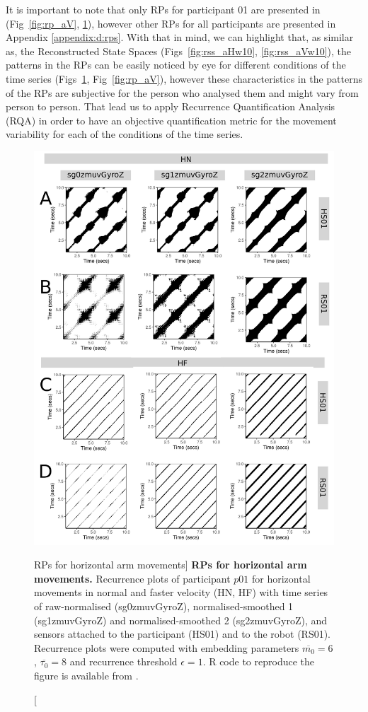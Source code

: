 It is important to note that only RPs for participant 01 are presented
in (Fig~\ref{fig:rp_aV}, \ref{fig:rp_aH}), however
other RPs for all participants are presented in Appendix \ref{appendix:d:rps}.
With that in mind, we can highlight that, as similar as, the 
Reconstructed State Spaces (Figs~\ref{fig:rss_aHw10}, \ref{fig:rss_aVw10}), 
the patterns in the RPs can be easily noticed by eye for different conditions 
of the time series (Figs~\ref{fig:rp_aH}, Fig~\ref{fig:rp_aV}),
however these characteristics in the patterns of the RPs are subjective 
for the person who analysed them and might vary from person to person. 
That lead us to apply Recurrence Quantification Analysis (RQA) in order 
to have an objective quantification metric for the movement variability 
for each of the conditions of the time series.
\begin{figure}
\centering
\includegraphics[height=0.80\textheight]{fig_6_06}
\caption
	[RPs for horizontal arm movements]{
	{\bf RPs for horizontal arm movements.}	
	Recurrence plots %
	of participant $p01$ for horizontal movements in normal and faster 
	velocity (HN, HF) with time series of raw-normalised (sg0zmuvGyroZ), 
	normalised-smoothed 1 (sg1zmuvGyroZ) and 
	normalised-smoothed 2 (sg2zmuvGyroZ), and 
	sensors attached to the participant (HS01) and to the robot (RS01).
	Recurrence plots were computed with 
	embedding parameters $\overline{m_0}=6$, $\overline{\tau_0}=8$ and
	recurrence threshold $\epsilon=1$.
	R code to reproduce the figure is available from \cite{xochicale2018}.
        }
    \label{fig:rp_aH}
\end{figure}
